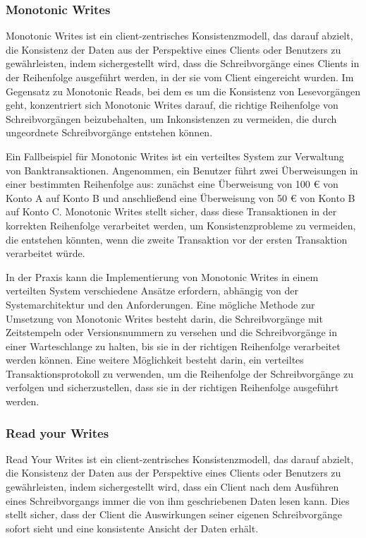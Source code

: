 \subsubsection{Monotonic Writes}

Monotonic Writes ist ein client-zentrisches Konsistenzmodell, das darauf abzielt, die Konsistenz der Daten aus der Perspektive eines Clients oder Benutzers zu gewährleisten, indem sichergestellt wird, dass die Schreibvorgänge eines Clients in der Reihenfolge ausgeführt werden, in der sie vom Client eingereicht wurden. Im Gegensatz zu Monotonic Reads, bei dem es um die Konsistenz von Lesevorgängen geht, konzentriert sich Monotonic Writes darauf, die richtige Reihenfolge von Schreibvorgängen beizubehalten, um Inkonsistenzen zu vermeiden, die durch ungeordnete Schreibvorgänge entstehen können.

Ein Fallbeispiel für Monotonic Writes ist ein verteiltes System zur Verwaltung von Banktransaktionen. Angenommen, ein Benutzer führt zwei Überweisungen in einer bestimmten Reihenfolge aus: zunächst eine Überweisung von 100 € von Konto A auf Konto B und anschließend eine Überweisung von 50 € von Konto B auf Konto C. Monotonic Writes stellt sicher, dass diese Transaktionen in der korrekten Reihenfolge verarbeitet werden, um Konsistenzprobleme zu vermeiden, die entstehen könnten, wenn die zweite Transaktion vor der ersten Transaktion verarbeitet würde.

In der Praxis kann die Implementierung von Monotonic Writes in einem verteilten System verschiedene Ansätze erfordern, abhängig von der Systemarchitektur und den Anforderungen. Eine mögliche Methode zur Umsetzung von Monotonic Writes besteht darin, die Schreibvorgänge mit Zeitstempeln oder Versionsnummern zu versehen und die Schreibvorgänge in einer Warteschlange zu halten, bis sie in der richtigen Reihenfolge verarbeitet werden können. Eine weitere Möglichkeit besteht darin, ein verteiltes Transaktionsprotokoll zu verwenden, um die Reihenfolge der Schreibvorgänge zu verfolgen und sicherzustellen, dass sie in der richtigen Reihenfolge ausgeführt werden.

\subsubsection{Read your Writes}
Read Your Writes ist ein client-zentrisches Konsistenzmodell, das darauf abzielt, die Konsistenz der Daten aus der Perspektive eines Clients oder Benutzers zu gewährleisten, indem sichergestellt wird, dass ein Client nach dem Ausführen eines Schreibvorgangs immer die von ihm geschriebenen Daten lesen kann. Dies stellt sicher, dass der Client die Auswirkungen seiner eigenen Schreibvorgänge sofort sieht und eine konsistente Ansicht der Daten erhält.

